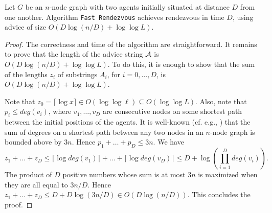 \documentclass{llncs}
\begin{document}
\begin{center}
\end{center}

\begin{theorem}\label{ub}
Let $G$ be an $n$-node graph with two agents initially situated at distance $D$ from one another.
Algorithm {\tt Fast Rendezvous} achieves rendezvous in time $D$, using advice of size
 $O(D\log(n/D)+\log\log L)$.
\end{theorem}

\begin{proof}
The correctness and time of the algorithm are straightforward. It remains to prove that the
 length of the advice string $\cal A$ is $O(D\log(n/D)+\log\log L)$. To do this, it is enough to show that the sum of the lengths $z_i$ of substrings $A_i$, for $i=0,\dots, D$,
 is $O(D\log(n/D)+\log\log L)$. 
 
 Note that $z_0=\lceil \log x \rceil \in O(\log\log \ell) \subseteq O( \log\log L)$. 
 Also, note that
 $p_i \leq deg(v_i)$, where $v_1,\dots, v_D$ are consecutive nodes on some shortest path between the initial positions of the agents.
 It is well-known (cf. e.g.,  \cite{FP1}) that the sum of degrees on a shortest path between any two nodes in an $n$-node graph is bounded above
 by $3n$. Hence $p_1+\dots +p_D \leq 3n$. We have 
 $$z_1+\dots +z_D \leq  \lceil \log deg(v_1) \rceil+\dots + \lceil \log deg(v_D) \rceil \leq D+ \log(\prod_{i=1}^{D}deg(v_i)).$$
 The product of $D$ positive numbers whose sum is at most $3n$ is maximized when they are all equal to $3n/D$.
 Hence $z_1+\dots +z_D \leq D + D\log (3n/D) \in O(D\log (n/D))$. This concludes the proof.
\end{proof}
\end{document}
